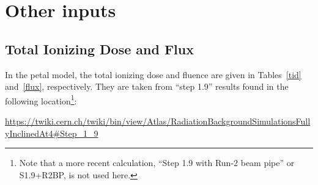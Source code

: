 
\section{Other inputs}

\subsection{Total Ionizing Dose and Flux}

In the petal model, the total ionizing dose and fluence are given in Tables~\ref{tid} and~\ref{flux},
respectively. They are taken from ``step 1.9'' results found in the following location\footnote{
Note that a more recent calculation, ``Step 1.9 with Run-2 beam pipe'' or S1.9+R2BP, is not used here.
}:

{\small
\url{https://twiki.cern.ch/twiki/bin/view/Atlas/RadiationBackgroundSimulationsFullyInclinedAt4#Step_1_9}
}

\begin{table}[ht]
\begin{centering} %
\caption{TID in 3000 fb$^{-1}$ of collected data [Rad]}
\label{tid}
\end{centering}
\end{table}


